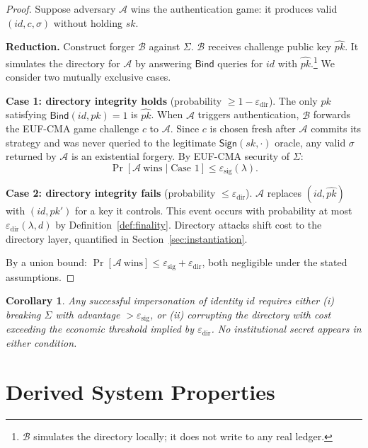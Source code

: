 \documentclass[11pt,a4paper]{article}
\newtheorem{corollary}[theorem]{Corollary}
\begin{document}
\begin{proof}
Suppose adversary $\mathcal{A}$ wins the authentication game: it produces
valid $(id, c, \sigma)$ without holding $sk$.

\textbf{Reduction.}  Construct forger $\mathcal{B}$ against $\Sigma$.
$\mathcal{B}$ receives challenge public key $\hat{pk}$.  It simulates the
directory for $\mathcal{A}$ by answering $\mathsf{Bind}$ queries for $id$
with $\hat{pk}$.\footnote{$\mathcal{B}$ simulates the directory locally; it
does not write to any real ledger.}  We consider two mutually exclusive cases.

\textbf{Case 1: directory integrity holds} (probability $\geq 1 -
\varepsilon_{\mathrm{dir}}$).  The only $pk$ satisfying
$\mathsf{Bind}(id,pk)=1$ is $\hat{pk}$.  When $\mathcal{A}$ triggers
authentication, $\mathcal{B}$ forwards the EUF-CMA game challenge $c$ to
$\mathcal{A}$.  Since $c$ is chosen fresh after $\mathcal{A}$ commits its
strategy and was never queried to the legitimate $\mathsf{Sign}(sk,\cdot)$
oracle, any valid $\sigma$ returned by $\mathcal{A}$ is an existential
forgery.  By EUF-CMA security of $\Sigma$:
\[
  \Pr[\mathcal{A}\ \text{wins} \mid \text{Case 1}]
  \leq \varepsilon_{\mathrm{sig}}(\lambda).
\]

\textbf{Case 2: directory integrity fails} (probability $\leq
\varepsilon_{\mathrm{dir}}$).  $\mathcal{A}$ replaces $(id, \hat{pk})$ with
$(id, pk')$ for a key it controls.  This event occurs with probability at
most $\varepsilon_{\mathrm{dir}}(\lambda,d)$ by Definition~\ref{def:finality}.  Directory
attacks shift cost to the directory layer, quantified in
Section~\ref{sec:instantiation}.

By a union bound:
$\Pr[\mathcal{A}\ \text{wins}] \leq
\varepsilon_{\mathrm{sig}} + \varepsilon_{\mathrm{dir}}$,
both negligible under the stated assumptions.
\end{proof}

\begin{corollary}
  Any successful impersonation of identity $id$ requires either (i) breaking
  $\Sigma$ with advantage $> \varepsilon_{\mathrm{sig}}$, or (ii) corrupting
  the directory with cost exceeding the economic threshold implied by
  $\varepsilon_{\mathrm{dir}}$.  No institutional secret appears in either
  condition.
\end{corollary}

\section{Derived System Properties}
\label{sec:derived}
\end{document}
